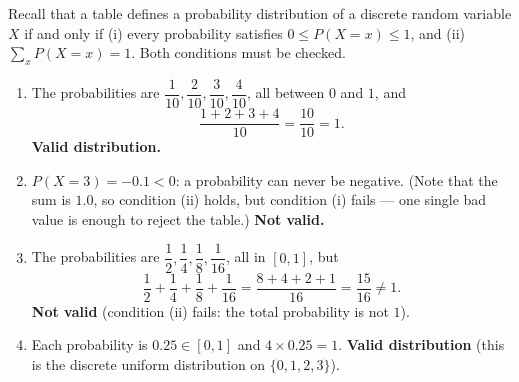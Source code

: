 \documentclass[11pt]{article}
\begin{document}
\begin{corrige}
Recall that a table defines a probability distribution of a discrete random variable $X$ if and only if (i) every probability satisfies $0 \le P(X=x) \le 1$, and (ii) $\sum_x P(X=x) = 1$. Both conditions must be checked.
\begin{enumerate}
\item The probabilities are $\dfrac{1}{10}, \dfrac{2}{10}, \dfrac{3}{10}, \dfrac{4}{10}$, all between $0$ and $1$, and
\[ \frac{1+2+3+4}{10} = \frac{10}{10} = 1. \]
\textbf{Valid distribution.}
\item $P(X=3) = -0.1 < 0$: a probability can never be negative. (Note that the sum is $1.0$, so condition (ii) holds, but condition (i) fails — one single bad value is enough to reject the table.) \textbf{Not valid.}
\item The probabilities are $\dfrac{1}{2}, \dfrac{1}{4}, \dfrac{1}{8}, \dfrac{1}{16}$, all in $[0,1]$, but
\[ \frac{1}{2} + \frac{1}{4} + \frac{1}{8} + \frac{1}{16} = \frac{8+4+2+1}{16} = \frac{15}{16} \neq 1. \]
\textbf{Not valid} (condition (ii) fails: the total probability is not $1$).
\item Each probability is $0.25 \in [0,1]$ and $4 \times 0.25 = 1$. \textbf{Valid distribution} (this is the discrete uniform distribution on $\{0,1,2,3\}$).
\end{enumerate}
\end{corrige}
\end{document}
